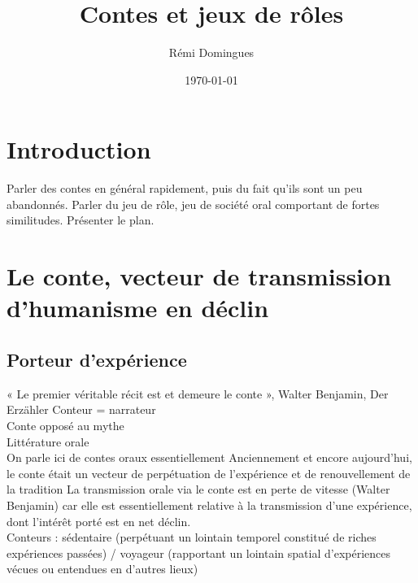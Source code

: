 \documentclass[a4paper,12pt,final,oneside]{article}
\title{Contes et jeux de rôles}
\author{Rémi Domingues}
\date{\today}
\begin{document}
\maketitle
\clearpage


\thispagestyle{empty}
\tableofcontents
\clearpage


\section{Introduction}
\setcounter{page}{1}

Parler des contes en général rapidement, puis du fait qu'ils sont un peu abandonnés. Parler du jeu de rôle, jeu de société oral comportant de fortes similitudes.
Présenter le plan.

\clearpage


\section{Le conte, vecteur de transmission d'humanisme en déclin}
\subsection{Porteur d'expérience}
\cite{nouss2003conteur}
« Le premier véritable récit est et demeure le conte », Walter Benjamin, Der Erzähler\cite{benjamin1991gesammelte}
Conteur = narrateur\\
Conte opposé au mythe\\
Littérature orale\\
On parle ici de contes oraux essentiellement
Anciennement et encore aujourd'hui, le conte était un vecteur de perpétuation de l'expérience et de renouvellement de la tradition
La transmission orale via le conte est en perte de vitesse (Walter Benjamin) car elle est essentiellement relative à la transmission d'une expérience, dont l'intérêt porté est en net déclin.\\
Conteurs : sédentaire (perpétuant un lointain temporel constitué de riches expériences passées) / voyageur (rapportant un lointain spatial d'expériences vécues ou entendues en d'autres lieux)\\
\end{document}
